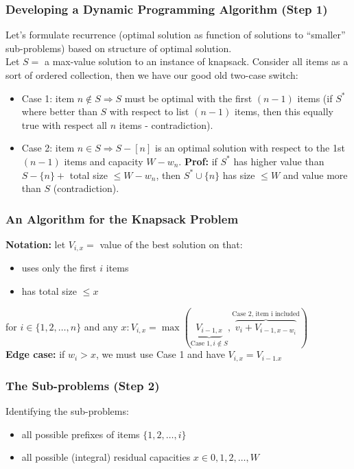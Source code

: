 \documentclass{scrartcl}
\begin{document}
\subsubsection{Developing a Dynamic Programming Algorithm (Step 1)}
\label{sec:9-1-1}
Let's formulate recurrence (optimal solution as function of solutions to
``smaller'' sub-problems) based on structure of optimal solution.\\
Let $S=$ a max-value solution to an instance of knapsack. Consider all items as
a sort of ordered collection, then we have our good old two-case switch:
\begin{itemize}
\item Case 1: item $n \notin S \Rightarrow S$ must be optimal with the first
  $(n-1)$ items (if $S^*$ where better than $S$ with respect to list $(n-1)$
  items, then this equally true with respect all $n$ items - contradiction).
\item Case 2: item $n \in S \Rightarrow S-[n]$ is an optimal solution with
  respect to the 1st $(n-1)$ items and capacity $W-w_n$. {\bf Prof: } if $S^*$
  has higher value than $S-\{n\} + $ total size $\leq W-w_n$, then $S^* \cup
  \{n\}$ has size $\leq W$ and value more than $S$ (contradiction).
\end{itemize}

\subsubsection{An Algorithm for the Knapsack Problem}
\label{sec:9-2} {\bf Notation: } let $V_{i, x} = $ value of the best solution on
that:
\begin{itemize}
\item uses only the first $i$ items
\item has total size $\leq x$
\end{itemize}
for $i \in \{1, 2, \dots, n\}$ and any $x: V_{i,x} = \max(\underbrace{V_{i-1,
    x}}_{\mbox{Case 1}, i \notin S}, \overbrace{v_i + V_{i-1,x -
    w_i}}^{\mbox{Case 2, item i included} }) $\\
{\bf Edge case: } if $w_i > x$, we must use Case 1 and have $V_{i, x} = V_{i-1.
  x}$

\subsubsection{The Sub-problems (Step 2)}
\label{sec:9-2-2}
Identifying the sub-problems:
\begin{itemize}
\item all possible prefixes of items $\{1, 2, \dots, i\}$
\item all possible (integral) residual capacities $x \in {0, 1, 2, \dots, W}$
\end{itemize}
\end{document}
